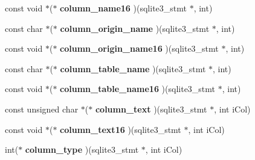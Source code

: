 \begin{DoxyCompactItemize}
\item 
const void $\ast$($\ast$ {\bfseries column\+\_\+name16} )(sqlite3\+\_\+stmt $\ast$, int)\hypertarget{structsqlite3__api__routines_a4ca83aec1d4cfe474f1afa0bcdde0e20}{}\label{structsqlite3__api__routines_a4ca83aec1d4cfe474f1afa0bcdde0e20}

\item 
const char $\ast$($\ast$ {\bfseries column\+\_\+origin\+\_\+name} )(sqlite3\+\_\+stmt $\ast$, int)\hypertarget{structsqlite3__api__routines_a18cb726aaf966e6d4a6954cb3c716991}{}\label{structsqlite3__api__routines_a18cb726aaf966e6d4a6954cb3c716991}

\item 
const void $\ast$($\ast$ {\bfseries column\+\_\+origin\+\_\+name16} )(sqlite3\+\_\+stmt $\ast$, int)\hypertarget{structsqlite3__api__routines_ae5022cdbd16222eaf08d5fdba9292142}{}\label{structsqlite3__api__routines_ae5022cdbd16222eaf08d5fdba9292142}

\item 
const char $\ast$($\ast$ {\bfseries column\+\_\+table\+\_\+name} )(sqlite3\+\_\+stmt $\ast$, int)\hypertarget{structsqlite3__api__routines_a66cc9e4b3cb918a699f3386df76ed1bc}{}\label{structsqlite3__api__routines_a66cc9e4b3cb918a699f3386df76ed1bc}

\item 
const void $\ast$($\ast$ {\bfseries column\+\_\+table\+\_\+name16} )(sqlite3\+\_\+stmt $\ast$, int)\hypertarget{structsqlite3__api__routines_a9b19d2cacecce0a09c5bdcffc6e44197}{}\label{structsqlite3__api__routines_a9b19d2cacecce0a09c5bdcffc6e44197}

\item 
const unsigned char $\ast$($\ast$ {\bfseries column\+\_\+text} )(sqlite3\+\_\+stmt $\ast$, int i\+Col)\hypertarget{structsqlite3__api__routines_a0857bdde632d86319b569c64668bed69}{}\label{structsqlite3__api__routines_a0857bdde632d86319b569c64668bed69}

\item 
const void $\ast$($\ast$ {\bfseries column\+\_\+text16} )(sqlite3\+\_\+stmt $\ast$, int i\+Col)\hypertarget{structsqlite3__api__routines_a893fc55c1762d1bb927d4821a1340dd9}{}\label{structsqlite3__api__routines_a893fc55c1762d1bb927d4821a1340dd9}

\item 
int($\ast$ {\bfseries column\+\_\+type} )(sqlite3\+\_\+stmt $\ast$, int i\+Col)\hypertarget{structsqlite3__api__routines_a1bfa18703e814caf9b940bd89247fde5}{}\label{structsqlite3__api__routines_a1bfa18703e814caf9b940bd89247fde5}


\end{DoxyCompactItemize}
